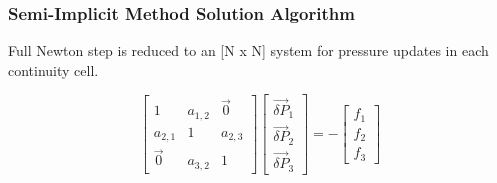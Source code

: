 \documentclass[compress,xcolor=table]{beamer}
\begin{document}
\begin{frame}
\frametitle{Semi-Implicit Method Solution Algorithm}

Full Newton step is reduced to an [N x N] system for pressure updates in each continuity cell.

\begin{equation*}
\label{eqn:si_pressure_matrix}
\begin{bmatrix} 
 1 & a_{1,2} & \vec{0} \\
a_{2,1} & 1 & a_{2,3} \\
\vec{0}           & a_{3,2} & 1
\end{bmatrix} \begin{bmatrix}
\vec{\delta P}_{1} \\
\vec{\delta P}_{2} \\
\vec{\delta P}_{3}
\end{bmatrix}  = -\begin{bmatrix}
f_{1} \\
f_{2} \\
f_{3}
\end{bmatrix}
\end{equation*}

\end{frame}

\end{document}
